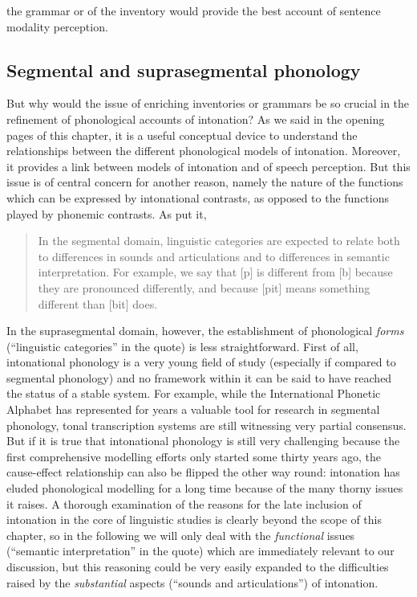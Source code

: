 the grammar or of the inventory would provide the best account of sentence modality perception.

\subsection{Segmental and suprasegmental phonology}\label{sec243}
But why would the issue of enriching inventories or grammars be so crucial in the refinement of phonological accounts of intonation? As we said in the opening pages of this chapter, it is a useful conceptual device to understand the relationships between the different phonological models of intonation. Moreover, it provides a link between models of intonation and of speech perception. But this issue is of central concern for another reason, namely the nature of the functions which can be expressed by intonational contrasts, as opposed to the functions played by phonemic contrasts. As \citeauthor{pierrehumbert1990meaning} put it, 
\begin{quote}
In the segmental domain, linguistic categories are expected to relate both to differences in sounds and articulations and to differences in semantic interpretation. For example, we say that [p] is different from [b] because they are pronounced differently, and because [pit] means something different than [bit] does. \cite[p. 282]{pierrehumbert1990meaning}
\end{quote}
In the suprasegmental domain, however, the establishment of phonological \textit{forms} (``linguistic categories'' in the quote) is less straightforward. First of all, intonational phonology is a very young field of study (especially if compared to segmental phonology) and no framework within it can be said to have reached the status of a stable system. For example, while the International Phonetic Alphabet has represented for years a valuable tool for research in segmental phonology, tonal transcription systems are still witnessing very partial consensus. But if it is true that intonational phonology is still very challenging because the first comprehensive modelling efforts only started some thirty years ago, the cause-effect relationship can also be flipped the other way round: intonation has eluded phonological modelling for a long time because of the many thorny issues it raises. A thorough examination of the reasons for the late inclusion of intonation in the core of linguistic studies is clearly beyond the scope of this chapter, so in the following we will only deal with the \textit{functional} issues (``semantic interpretation'' in the quote) which are immediately relevant to our discussion, but this reasoning could be very easily expanded to the difficulties raised by the \textit{substantial} aspects (``sounds and articulations'') of intonation.

